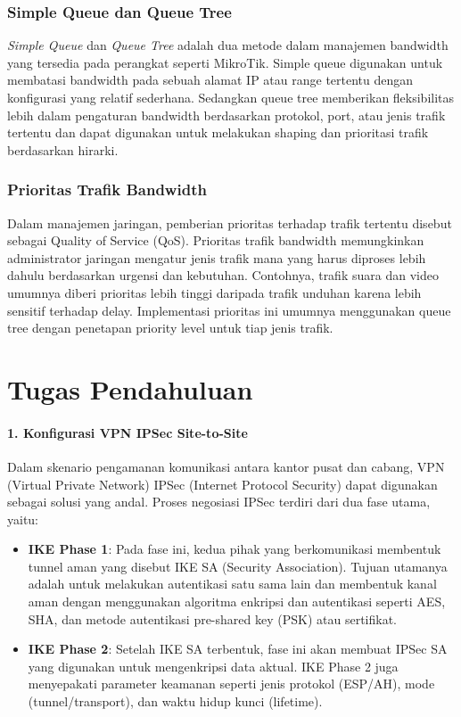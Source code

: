 \subsubsection{Simple Queue dan Queue Tree}
\textit{Simple Queue} dan \textit{Queue Tree} adalah dua metode dalam manajemen bandwidth yang tersedia pada perangkat seperti MikroTik. Simple queue digunakan untuk membatasi bandwidth pada sebuah alamat IP atau range tertentu dengan konfigurasi yang relatif sederhana. Sedangkan queue tree memberikan fleksibilitas lebih dalam pengaturan bandwidth berdasarkan protokol, port, atau jenis trafik tertentu dan dapat digunakan untuk melakukan shaping dan prioritasi trafik berdasarkan hirarki.

\subsubsection{Prioritas Trafik Bandwidth}
Dalam manajemen jaringan, pemberian prioritas terhadap trafik tertentu disebut sebagai Quality of Service (QoS). Prioritas trafik bandwidth memungkinkan administrator jaringan mengatur jenis trafik mana yang harus diproses lebih dahulu berdasarkan urgensi dan kebutuhan. Contohnya, trafik suara dan video umumnya diberi prioritas lebih tinggi daripada trafik unduhan karena lebih sensitif terhadap delay. Implementasi prioritas ini umumnya menggunakan queue tree dengan penetapan priority level untuk tiap jenis trafik.


\section*{Tugas Pendahuluan}

\paragraph{1. Konfigurasi VPN IPSec Site-to-Site}

Dalam skenario pengamanan komunikasi antara kantor pusat dan cabang, VPN (Virtual Private Network) IPSec (Internet Protocol Security) dapat digunakan sebagai solusi yang andal. Proses negosiasi IPSec terdiri dari dua fase utama, yaitu:

\begin{itemize}
  \item \textbf{IKE Phase 1}: Pada fase ini, kedua pihak yang berkomunikasi membentuk tunnel aman yang disebut IKE SA (Security Association). Tujuan utamanya adalah untuk melakukan autentikasi satu sama lain dan membentuk kanal aman dengan menggunakan algoritma enkripsi dan autentikasi seperti AES, SHA, dan metode autentikasi pre-shared key (PSK) atau sertifikat. 
  \item \textbf{IKE Phase 2}: Setelah IKE SA terbentuk, fase ini akan membuat IPSec SA yang digunakan untuk mengenkripsi data aktual. IKE Phase 2 juga menyepakati parameter keamanan seperti jenis protokol (ESP/AH), mode (tunnel/transport), dan waktu hidup kunci (lifetime).
\end{itemize}

